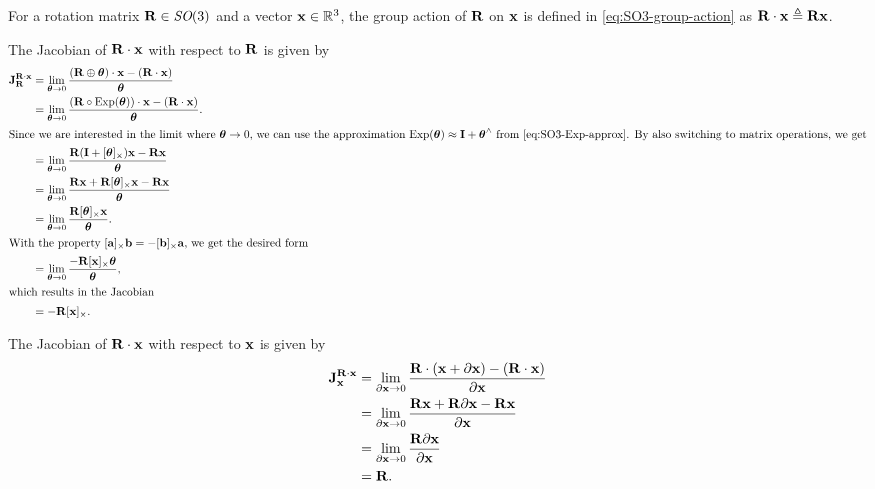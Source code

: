 \begin{example}[frametitle=Computing the Jacobians for $\matR \cdot \vecx$] \label{ex:lie-group-action-jac-SO3-example}
For a rotation matrix $\matR \in \SO(3)$ and a vector $\vecx \in \bbR^3$, the group action of $\matR$ on $\vecx$ is defined in \eqref{eq:SO3-group-action} as $\matR \cdot \vecx \triangleq \matR \vecx$.

The Jacobian of $\matR \cdot \vecx$ with respect to $\matR$ is given by
\begin{subequations}
\begin{align}
  \jac{\matR \cdot \vecx}{\matR} &= \lim_{\vectheta \to 0} 
  \frac{(\matR \oplus \vectheta) \cdot \vecx - (\matR \cdot \vecx)}{\vectheta}\\
  &= \lim_{\vectheta \to 0} 
  \frac{(\matR \circ \Exp(\vectheta)) \cdot \vecx - (\matR \cdot \vecx)}{\vectheta}.\\
  \intertext{Since we are interested in the limit where $\vectheta \to 0$, we can use the approximation $\Exp(\vectheta) \approx \matI + \vectheta^\wedge$ from \eqref{eq:SO3-Exp-approx}. By also switching to matrix operations, we get}
  &= \lim_{\vectheta \to 0} 
  \frac{\matR (\matI + [\vectheta]_\times) \vecx - \matR \vecx}{\vectheta}\\
  &= \lim_{\vectheta \to 0} 
  \frac{\matR \vecx + \matR [\vectheta]_\times \vecx - \matR \vecx}{\vectheta}\\
  &= \lim_{\vectheta \to 0} 
  \frac{\matR [\vectheta]_\times \vecx}{\vectheta}.\\
  \intertext{With the property $\skewsymm{\veca}\vecb = -\skewsymm{\vecb}\veca$, we get the desired form}
  &= \lim_{\vectheta \to 0} 
  \frac{-\matR [\vecx]_\times \vectheta}{\vectheta},\\
  \intertext{which results in the Jacobian}
  &= -\matR [\vecx]_\times.
\end{align}
\end{subequations}

The Jacobian of $\matR \cdot \vecx$ with respect to $\vecx$ is given by
\begin{subequations}
\begin{align}
  \jac{\matR \cdot \vecx}{\vecx} &= \lim_{\partial \vecx \to 0} 
  \frac{\matR \cdot (\vecx + \partial \vecx) - (\matR \cdot \vecx)}{\partial \vecx}\\
  &= \lim_{\partial \vecx \to 0} 
  \frac{\matR \vecx + \matR \partial \vecx - \matR \vecx}{\partial \vecx}\\
  &= \lim_{\partial \vecx \to 0} 
  \frac{\matR \partial \vecx}{\partial \vecx}\\
  &= \matR.
\end{align}
\end{subequations}
\end{example}


